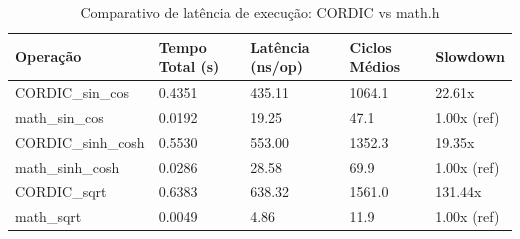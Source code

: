 \begin{table}
\caption{Comparativo de latência de execução: CORDIC vs math.h}
\label{tab:benchmark}
\begin{tabular}{lllll}
\toprule
Operação & Tempo Total (s) & Latência (ns/op) & Ciclos Médios & Slowdown \\
\midrule
CORDIC_sin_cos & 0.4351 & 435.11 & 1064.1 & 22.61x \\
math_sin_cos & 0.0192 & 19.25 & 47.1 & 1.00x (ref) \\
CORDIC_sinh_cosh & 0.5530 & 553.00 & 1352.3 & 19.35x \\
math_sinh_cosh & 0.0286 & 28.58 & 69.9 & 1.00x (ref) \\
CORDIC_sqrt & 0.6383 & 638.32 & 1561.0 & 131.44x \\
math_sqrt & 0.0049 & 4.86 & 11.9 & 1.00x (ref) \\
\bottomrule
\end{tabular}
\end{table}
